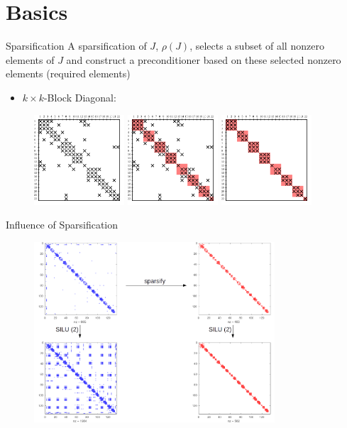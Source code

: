 \documentclass{beamer}
\newcommand{\sparsifysymbol}{\ensuremath{\rho}}
\newcommand{\sparsify}[1]{\ensuremath{\sparsifysymbol(#1)}}
\begin{document}
\section{Basics}
\begin{frame}{Sparsification}
A sparsification of $J$, \sparsify{J}, selects a 
subset of all nonzero elements of $J$ and construct a
preconditioner based on these selected nonzero elements (required elements)
\begin{itemize}
\item $k\times k$-Block Diagonal:
\end{itemize}
\begin{figure}
\centering
\includegraphics[width=0.3\textwidth]{mat}
\includegraphics[width=0.3\textwidth]{mat_sparsify}
\includegraphics[width=0.3\textwidth]{mat_sparsify_removed}
\end{figure}
\end{frame}

\begin{frame}{Influence of Sparsification}
\begin{figure}
\centering
\includegraphics[width=0.8\textwidth]{sparsify}
\end{figure}
\end{frame}
\end{document}
